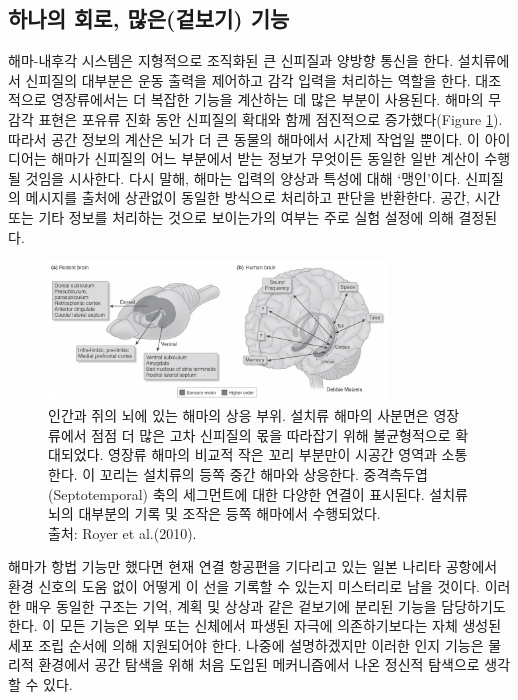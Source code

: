 \documentclass[openany]{book}
\begin{document}
\begin{appendices}
\section{하나의 회로, 많은(겉보기) 기능}
해마-내후각 시스템은 지형적으로 조직화된 큰 신피질과 양방향 통신을 한다. 설치류에서 신피질의 대부분은 운동 출력을 제어하고 감각 입력을 처리하는 역할을 한다. 대조적으로 영장류에서는 더 복잡한 기능을 계산하는 데 많은 부분이 사용된다. 해마의 무감각 표현은 포유류 진화 동안 신피질의 확대와 함께 점진적으로 증가했다(Figure \ref{fig:5_6}). 따라서 공간 정보의 계산은 뇌가 더 큰 동물의 해마에서 시간제 작업일 뿐이다. 이 아이디어는 해마가 신피질의 어느 부분에서 받는 정보가 무엇이든 동일한 일반 계산이 수행될 것임을 시사한다. 다시 말해, 해마는 입력의 양상과 특성에 대해 `맹인’이다. 신피질의 메시지를 출처에 상관없이 동일한 방식으로 처리하고 판단을 반환한다. 공간, 시간 또는 기타 정보를 처리하는 것으로 보이는가의 여부는 주로 실험 설정에 의해 결정된다.
\begin{figure}[htb!]
  \centering
  \includegraphics[width=0.8\textwidth]{image/5_6}
  \caption{인간과 쥐의 뇌에 있는 해마의 상응 부위. 설치류 해마의 사분면은 영장류에서 점점 더 많은 고차 신피질의 몫을 따라잡기 위해 불균형적으로 확대되었다. 영장류 해마의 비교적 작은 꼬리 부분만이 시공간 영역과 소통한다. 이 꼬리는 설치류의 등쪽 중간 해마와 상응한다. 중격측두엽(Septotemporal) 축의 세그먼트에 대한 다양한 연결이 표시된다. 설치류 뇌의 대부분의 기록 및 조작은 등쪽 해마에서 수행되었다.\\출처: Royer et al.(2010).}
  \label{fig:5_6}
\end{figure}

해마가 항법 기능만 했다면 현재 연결 항공편을 기다리고 있는 일본 나리타 공항에서 환경 신호의 도움 없이 어떻게 이 선을 기록할 수 있는지 미스터리로 남을 것이다. 이러한 매우 동일한 구조는 기억, 계획 및 상상과 같은 겉보기에 분리된 기능을 담당하기도 한다. 이 모든 기능은 외부 또는 신체에서 파생된 자극에 의존하기보다는 자체 생성된 세포 조립 순서에 의해 지원되어야 한다. 나중에 설명하겠지만 이러한 인지 기능은 물리적 환경에서 공간 탐색을 위해 처음 도입된 메커니즘에서 나온 정신적 탐색으로 생각할 수 있다.


\end{appendices}
\end{document}
